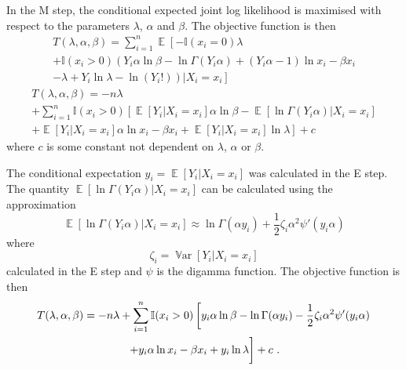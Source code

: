 \documentclass[12pt, a4paper]{memoir}
\DeclareMathOperator{\expectation}{\mathbb{E}}
\DeclareMathOperator{\variance}{\mathbb{V}ar}
\begin{document}
In the M step, the conditional expected joint log likelihood is maximised with respect to the parameters $\lambda$, $\alpha$ and $\beta$. The objective function is then
\begin{multline*}
	T(\lambda,\alpha,\beta)=
	\sum_{i=1}^n
	\expectation\left[
		-\mathbb{I}(x_i=0)
		\lambda
	\right.
	\\
	\left.+
		\mathbb{I}(x_i>0)
		\left(
			Y_i\alpha\ln\beta-\ln\Gamma(Y_i\alpha)+(Y_i\alpha-1)\ln x_i - \beta x_i
		\right.
	\right.
	\\
	\left.
		\left.	
			- \lambda + Y_i \ln \lambda - \ln(Y_i!)
		\right)
		|X_i=x_i
	\right]
\end{multline*}
\begin{multline*}
	T(\lambda,\alpha,\beta)=
	-n\lambda
	\\
	+\sum_{i=1}^n
	\mathbb{I}(x_i>0)
	\left[
		\expectation[Y_i|X_i=x_i]\alpha\ln\beta-\expectation[\ln\Gamma(Y_i\alpha)|X_i=x_i]
	\right.
	\\
	\left.
		+\expectation[Y_i|X_i=x_i]\alpha\ln x_i - \beta x_i
		+ \expectation[Y_i|X_i=x_i] \ln \lambda
	\right] + c
\end{multline*}
where $c$ is some constant not dependent on $\lambda$, $\alpha$ or $\beta$.

The conditional expectation $y_i = \expectation[Y_i|X_i=x_i]$ was calculated in the E step. The quantity $\expectation[\ln\Gamma(Y_i\alpha)|X_i=x_i]$ can be calculated using the approximation
\begin{equation}
	\expectation[\ln\Gamma(Y_i\alpha)|X_i=x_i] \approx
	\ln\Gamma(\alpha y_i) + \frac{1}{2}\zeta_i\alpha^2\psi'(y_i\alpha)
\end{equation}
where
\begin{equation}
	\zeta_i = \variance[Y_i|X_i=x_i]
\end{equation}
calculated in the E step and $\psi$ is the digamma function. The objective function is then
\begin{multline}
	T(\lambda,\alpha,\beta)=
	-n\lambda
	+\sum_{i=1}^n
	\mathbb{I}(x_i>0)
	\left[
		y_i\alpha\ln\beta-\ln\Gamma(\alpha y_i) - \frac{1}{2}\zeta_i\alpha^2\psi'(y_i\alpha)
	\right.
	\\
	\left.
		+y_i\alpha\ln x_i - \beta x_i
		+ y_i \ln \lambda
		\vphantom{\frac{1}{1}}
	\right]
	+ c
	\ .
\end{multline}
\end{document}
